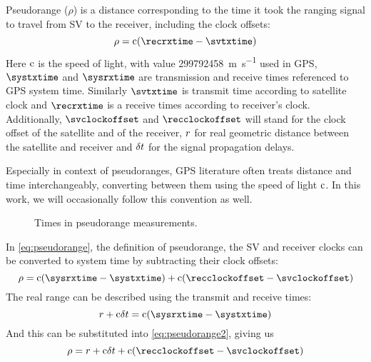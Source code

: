 Pseudorange (\(\rho\)) is a distance corresponding to the time it took the ranging
signal to travel from SV to the receiver, including the clock offsets:
\begin{equation}
	\label{eq:pseudorange}
	\rho = \speedoflight (\recrxtime - \svtxtime)
\end{equation}
Here \(\mathrm{c}\) is the speed of light, with value \SI{299792458}{\meter\per\second} used in GPS,
\(\systxtime\) and \(\sysrxtime\) are transmission and receive times referenced to GPS system time.
Similarly \(\svtxtime\) is transmit time according to satellite clock and
\(\recrxtime\) is a receive times according to receiver's clock.
Additionally, \(\svclockoffset\) and \(\recclockoffset\) will stand for the clock offset of the satellite
and of the receiver, \(r\) for real geometric distance between the satellite and receiver
and \(\delta{t}\) for the signal propagation delays.

Especially in context of pseudoranges, GPS literature often treats distance and time
interchangeably, converting between them using the speed of light \(\mathrm{c}\).
In this work, we will occasionally follow this convention as well.

\begin{figure}[tb]
	\centering
	
	\caption{Times in pseudorange measurements.}
	\label{fig:pseudorange}
\end{figure}

In \eqref{eq:pseudorange}, the definition of pseudorange, the SV and receiver clocks can be
converted to system time by subtracting their clock offsets:
\begin{equation}
	\label{eq:pseudorange2}
	\rho = \speedoflight (\sysrxtime - \systxtime) + \speedoflight (\recclockoffset - \svclockoffset)
\end{equation}
The real range can be described using the transmit and receive times:
\begin{equation}
	\geomrange + \speedoflight\geomrangedelays = \speedoflight (\sysrxtime - \systxtime)
\end{equation}
And this can be substituted into \eqref{eq:pseudorange2}, giving us
\begin{equation}
	\rho = \geomrange + \speedoflight\geomrangedelays + \speedoflight (\recclockoffset - \svclockoffset)
\end{equation}


